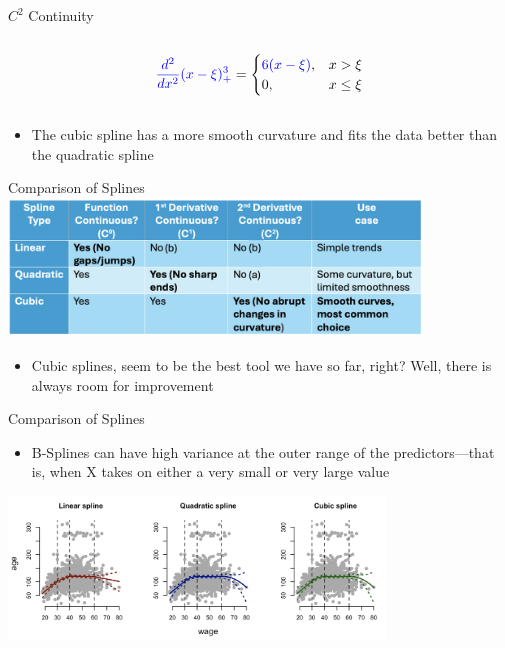 \documentclass[english]{beamer}
\newcommand{\alertblue}[1]{{\color{blue}#1}}
\begin{document}
\begin{frame}{$C^2$ Continuity}
\begin{columns}
\begin{column}{0.7\textwidth}
       \begin{equation*}
         \alertblue{\frac{d^2}{dx^2}(x - \xi)^3_+} = 
         \begin{cases} 
         \alertblue{6(x - \xi)}, & x > \xi \\ 
         0, & x \leq \xi 
         \end{cases}
       \end{equation*}
      \end{column}
        \end{columns}
    \begin{itemize}   
        \item The cubic spline has a \alertblue{more smooth curvature} and \alertblue{fits the data better} than the quadratic spline 
    \end{itemize}    
\end{frame}
\begin{frame}{Comparison of Splines}
    \centering
    \includegraphics[width=11cm,keepaspectratio]{images/comparison_splines.png}
    \begin{itemize}
        \item Cubic splines, seem to be the best tool we have so far, right? \alertblue{Well, there is always room for improvement}
    \end{itemize}
\end{frame}
\begin{frame}{Comparison of Splines}
    \begin{itemize}
        \item \alertblue{B-Splines can have high variance at the outer range of the
        predictors}—that is, when X takes on either a very small or very large value
    \end{itemize}
    \centering
    \includegraphics[width=10cm]{images/cubic_splines_issue.png}
\end{frame}
\end{document}

